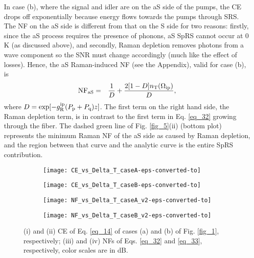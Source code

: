 \documentclass[10pt,letterpaper]{article}
\begin{document}
In case (b), where the signal and idler are on the aS side of the pumps, the CE drops off exponentially because energy flows towards the pumps through SRS. The NF on the aS side is different from that on the S side for two reasons: firstly, since the aS process requires the presence of phonons, aS SpRS cannot occur at 0 K (as discussed above), and secondly, Raman depletion removes photons from a wave component so the SNR must change accordingly (much like the effect of losses). Hence, the aS Raman-induced NF (see the Appendix), valid for case (b), is
\begin{eqnarray}\label{eq_33}
{\rm NF_{aS}} &=& \frac{1}{D}+ \frac{2[1-D] n_{\rm T}(\Omega_{\rm ip})}{D},
\end{eqnarray}
where $D = \exp[-g_{\rm R}^{\rm ip}(P_{\rm p}+P_{\rm q})z]$. The first term on the right hand side, the Raman depletion term, is in contrast to the first term in Eq. \eqref{eq_32} growing through the fiber. The dashed green line of Fig. \ref{fig_5}(ii) (bottom plot) represents the minimum Raman NF of the aS side as caused by Raman depletion, and the region between that curve and the analytic curve is the entire SpRS contribution.



\begin{figure}[!t]
\centering 
\begin{subfigure}[i]{0.49\linewidth}  \centering
\texttt{[image: CE\_vs\_Delta\_T\_caseA-eps-converted-to]}
\caption{ }
\end{subfigure} 
\begin{subfigure}{0.49\linewidth}  \centering
\texttt{[image: CE\_vs\_Delta\_T\_caseB-eps-converted-to]}
\caption{ }
\end{subfigure}

\begin{subfigure}[i]{0.49\linewidth}  \centering
\texttt{[image: NF\_vs\_Delta\_T\_caseA\_v2-eps-converted-to]}
\caption{ }
\end{subfigure} 
\begin{subfigure}{0.49\linewidth}  \centering
\texttt{[image: NF\_vs\_Delta\_T\_caseB\_v2-eps-converted-to]}
\caption{ }
\end{subfigure}%
\caption{(i) and (ii) CE of Eq. \eqref{eq_14} of cases (a) and (b) of Fig. \ref{fig_1}, respectively; (iii) and (iv) NFs of Eqs. \eqref{eq_32} and \eqref{eq_33}, respectively, color scales are in dB.} 
\label{fig_6}
\end{figure}
\end{document}
